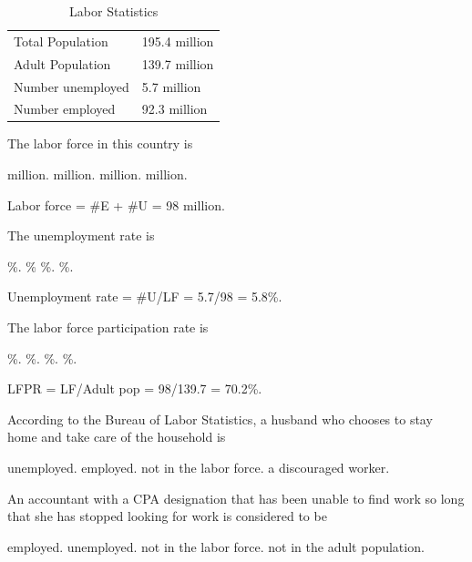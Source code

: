 \documentclass[addpoints,11pt]{exam}
\theoremstyle{definition}
\begin{document}
\begin{questions}

\begin{table}[H]
	\centering
	\caption{Labor Statistics}
	\label{tab4}
	\begin{tabular}{ll}        
		
		
		Total Population & 195.4 million \\
		Adult Population & 139.7 million \\
		Number unemployed & 5.7 million \\
		Number employed & 92.3 million \\
		
	\end{tabular}
\end{table}


\question \label{q21} The labor force in this country is

\begin{choices}
	 million.
	 million.
	 million.
	 million.
\end{choices}

\begin{solution} 
	Labor force = \#E + \#U = 98 million.
\end{solution}

\question \label{q22} The unemployment rate is

\begin{choices}
	\%.
	\%
	\%.
	\%.
\end{choices}

\begin{solution} 
	Unemployment rate = \#U/LF = 5.7/98 = 5.8\%.
\end{solution}

\question \label{q23} The labor force participation rate is 

\begin{choices}
	\%.
	\%.
	\%.
	\%.
\end{choices}

\begin{solution} 
	LFPR = LF/Adult pop = 98/139.7 = 70.2\%.
\end{solution}

\question According to the Bureau of Labor Statistics, a husband who chooses to stay home and take care of the household is

\begin{choices}
	\choice unemployed.
	\choice employed.
	\CorrectChoice not in the labor force.
	\choice a discouraged worker.
\end{choices}

\question An accountant with a CPA designation that has been unable to find work so long that she has stopped looking for work is considered to be

\begin{choices}
	\choice employed.
	\choice unemployed.
	\CorrectChoice not in the labor force.
	\choice not in the adult population.
\end{choices}
	
\end{questions}
\end{document}
